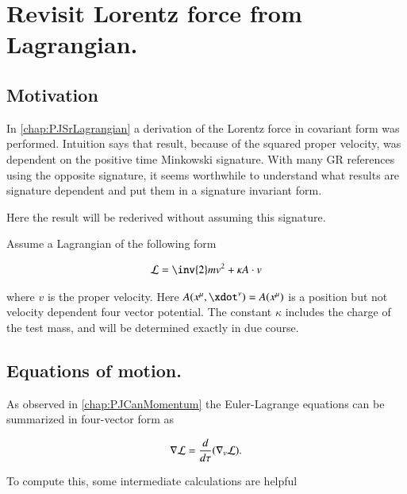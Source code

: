 \chapter{Revisit Lorentz force from Lagrangian.}\label{chap:PJSrLorentzForce}
\date{ October 8, 2008.  Last Revision: $Date: 2009/06/04 13:13:27 $ }

\section{Motivation }

In \ref{chap:PJSrLagrangian} a derivation of the Lorentz force in covariant
form was performed.  Intuition says that result, because of the squared
proper velocity, was dependent on the 
positive time Minkowski signature.
With many
GR references using the opposite signature, it seems worthwhile to understand
what results are signature dependent and put them in a signature invariant form.

Here the result will be rederived without assuming this signature.

Assume a Lagrangian of the following form

\begin{align}\label{eqn:lorForce:potlag}
\LL = \inv{2}m v^2 + \kappa A \cdot v
\end{align}

where $v$ is the proper velocity.  Here $A(x^\mu,\xdot^\nu) = A(x^\mu)$ is a position but not velocity dependent four vector potential.  The constant $\kappa$ includes the charge of the test mass, and will be determined exactly in due course.

\section{Equations of motion. }

As observed in \ref{chap:PJCanMomentum} the Euler-Lagrange equations can be summarized in four-vector form as

\begin{align}
\nabla \mathcal{L} = \frac{d}{d\tau}(\nabla_v \mathcal{L}).
\end{align}

To compute this, some intermediate calculations are helpful

